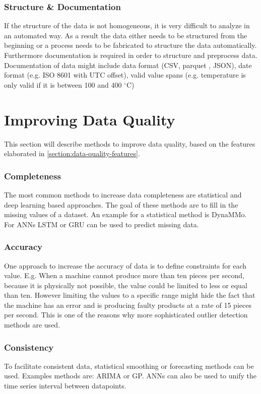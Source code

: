 \subsubsection{Structure \& Documentation}
If the structure of the data is not homogeneous, it is very difficult to analyze in an automated way. As a result the data either needs to be structured from the beginning or a process needs to be fabricated to structure the data automatically. Furthermore documentation is required in order to structure and preprocess data. Documentation of data might include data format (\ac{CSV}, parquet \cite{ApacheParquet2021}, \ac{JSON}), date format (e.g. ISO 8601 with UTC offset), valid value spans (e.g. temperature is only valid if it is between 100 and 400 $^{\circ}$C)
\cite{caiChallengesDataQuality2015}

\section{Improving Data Quality}\label{section:imrpoving-data-quality}
This section will describe methods to improve data quality, based on the features elaborated in \autoref{section:data-quality-features}.
\subsubsection{Completeness}
The most common methods to increase data completeness are statistical and deep learning based approaches. The goal of these methods are to fill in the missing values of a dataset. An example for a statistical method is DynaMMo\cite{liDynaMMoMiningSummarization2009}. For \acp{ANN} \ac{LSTM} or \ac{GRU} can be used to predict missing data. \cite{songIoTDataQuality2020}
\subsubsection{Accuracy}
One approach to increase the accuracy of data is to define constraints for each value. E.g. When a machine cannot produce more than ten pieces per second, because it is physically not possible, the value could be limited to less or equal than ten. However limiting the values to a specific range might hide the fact that the machine  has an error and is producing faulty products at a rate of 15 pieces per second. This is one of the reasons why more sophisticated outlier detection methods are used. \cite{songIoTDataQuality2020}

\subsubsection{Consistency}
To facilitate consistent data, statistical smoothing or forecasting methods can be used. Examples methods are: \ac{ARIMA} or \ac{GP}. \acp{ANN} can also be used to unify the time series interval between datapoints. \cite{songIoTDataQuality2020}

